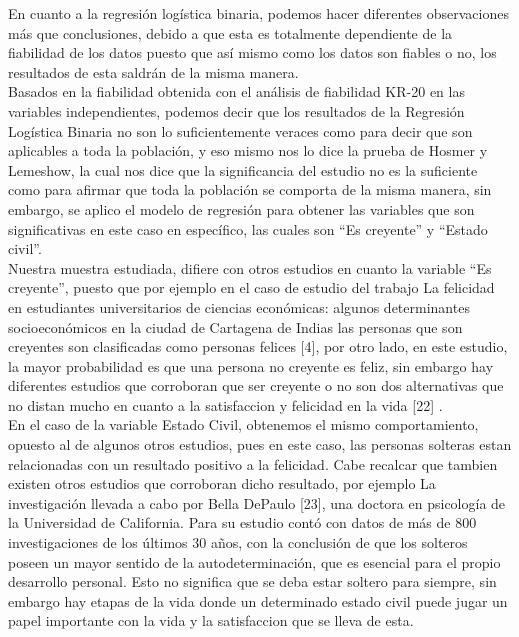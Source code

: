 \documentclass[conference]{IEEEtran}
\begin{document}
   En cuanto a la regresión logística binaria, podemos hacer diferentes observaciones más que conclusiones, debido a que esta es totalmente dependiente de la fiabilidad de los datos puesto que así mismo como los datos son fiables o no, los resultados de esta saldrán de la misma manera.\\

   Basados en la fiabilidad obtenida con el análisis de fiabilidad KR-20 en las variables independientes, podemos decir que los resultados de la Regresión Logística Binaria no son lo suficientemente veraces como para decir que son aplicables a toda la población, y eso mismo nos lo dice la prueba de Hosmer y Lemeshow, la cual nos dice que la significancia del estudio no es la suficiente como para afirmar que toda la población se comporta de la misma manera, sin embargo, se aplico el modelo de regresión para obtener las variables que son significativas en este caso en específico, las cuales son “Es creyente” y “Estado civil”.\\

   Nuestra muestra estudiada, difiere con otros estudios en cuanto la variable “Es creyente”, puesto que por ejemplo en el caso de estudio del trabajo La felicidad en estudiantes universitarios de ciencias económicas: algunos determinantes socioeconómicos en la ciudad de Cartagena de Indias las personas que son creyentes son clasificadas como personas felices [4], por otro lado, en este estudio, la mayor probabilidad es que una persona no creyente es feliz, sin embargo hay diferentes estudios que corroboran que ser creyente o no son dos alternativas que no distan mucho en cuanto a la satisfaccion y felicidad en la vida [22] .\\

   En el caso de la variable Estado Civil, obtenemos el mismo comportamiento, opuesto al de algunos otros estudios, pues en este caso, las personas solteras estan relacionadas con un resultado positivo a la felicidad. Cabe recalcar que tambien existen otros estudios que corroboran dicho resultado, por ejemplo La investigación llevada a cabo por Bella DePaulo [23], una doctora en psicología de la Universidad de California. Para su estudio contó con datos de más de 800 investigaciones de los últimos 30 años, con la conclusión de que los solteros poseen un mayor sentido de la autodeterminación, que es esencial para el propio desarrollo personal. Esto no significa que se deba estar soltero para siempre, sin embargo hay etapas de la vida donde un determinado estado civil puede jugar un papel importante con la vida y la satisfaccion que se lleva de esta.
\end{document}
